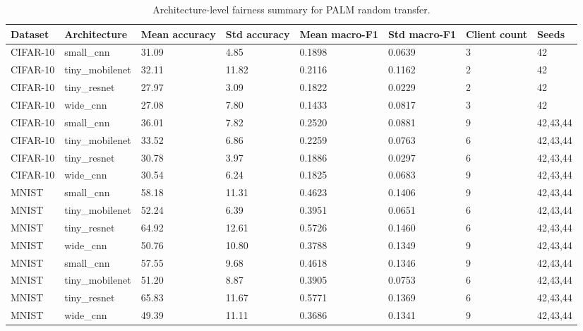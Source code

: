 \begin{table}[t]
\centering
\caption{Architecture-level fairness summary for PALM random transfer.}
\label{tab:generated_fairness}
\scriptsize
\begin{tabular}{llllllll}
\toprule
Dataset & Architecture & Mean accuracy & Std accuracy & Mean macro-F1 & Std macro-F1 & Client count & Seeds \\
\midrule
CIFAR-10 & small\_cnn & 31.09 & 4.85 & 0.1898 & 0.0639 & 3 & 42 \\
CIFAR-10 & tiny\_mobilenet & 32.11 & 11.82 & 0.2116 & 0.1162 & 2 & 42 \\
CIFAR-10 & tiny\_resnet & 27.97 & 3.09 & 0.1822 & 0.0229 & 2 & 42 \\
CIFAR-10 & wide\_cnn & 27.08 & 7.80 & 0.1433 & 0.0817 & 3 & 42 \\
CIFAR-10 & small\_cnn & 36.01 & 7.82 & 0.2520 & 0.0881 & 9 & 42,43,44 \\
CIFAR-10 & tiny\_mobilenet & 33.52 & 6.86 & 0.2259 & 0.0763 & 6 & 42,43,44 \\
CIFAR-10 & tiny\_resnet & 30.78 & 3.97 & 0.1886 & 0.0297 & 6 & 42,43,44 \\
CIFAR-10 & wide\_cnn & 30.54 & 6.24 & 0.1825 & 0.0683 & 9 & 42,43,44 \\
MNIST & small\_cnn & 58.18 & 11.31 & 0.4623 & 0.1406 & 9 & 42,43,44 \\
MNIST & tiny\_mobilenet & 52.24 & 6.39 & 0.3951 & 0.0651 & 6 & 42,43,44 \\
MNIST & tiny\_resnet & 64.92 & 12.61 & 0.5726 & 0.1460 & 6 & 42,43,44 \\
MNIST & wide\_cnn & 50.76 & 10.80 & 0.3788 & 0.1349 & 9 & 42,43,44 \\
MNIST & small\_cnn & 57.55 & 9.68 & 0.4618 & 0.1346 & 9 & 42,43,44 \\
MNIST & tiny\_mobilenet & 51.20 & 8.87 & 0.3905 & 0.0753 & 6 & 42,43,44 \\
MNIST & tiny\_resnet & 65.83 & 11.67 & 0.5771 & 0.1369 & 6 & 42,43,44 \\
MNIST & wide\_cnn & 49.39 & 11.11 & 0.3686 & 0.1341 & 9 & 42,43,44 \\
\bottomrule
\end{tabular}
\end{table}
